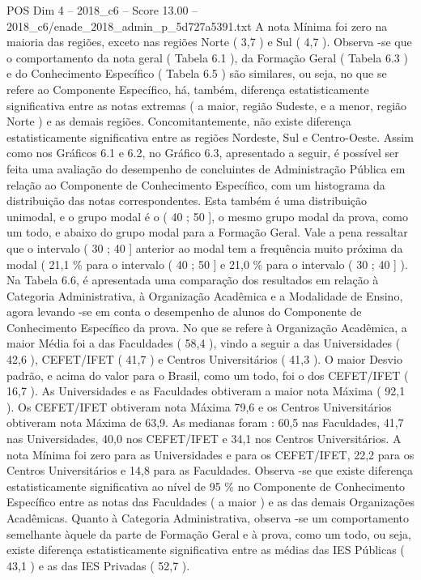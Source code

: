 \begin{textsample}{POS Dim 4 – 2018\_c6 – Score 13.00 – 2018\_c6/enade\_2018\_admin\_p\_5d727a5391.txt}
A nota Mínima foi zero na maioria das regiões, exceto nas regiões Norte ( 3,7 ) e Sul ( 4,7 ).
Observa -se que o comportamento da nota geral ( Tabela 6.1 ), da Formação Geral ( Tabela 6.3 ) e do Conhecimento Específico ( Tabela 6.5 ) são similares, ou seja, no que se refere ao Componente Específico, há, também, diferença estatisticamente significativa entre as notas extremas ( a maior, região Sudeste, e a menor, região Norte ) e as demais regiões.
Concomitantemente, não existe diferença estatisticamente significativa entre as regiões Nordeste, Sul e Centro-Oeste.
Assim como nos Gráficos 6.1 e 6.2, no Gráfico 6.3, apresentado a seguir, é possível ser feita uma avaliação do desempenho de concluintes de Administração Pública em relação ao Componente de Conhecimento Específico, com um histograma da distribuição das notas correspondentes.
Esta também é uma distribuição unimodal, e o grupo modal é o ( 40 ; 50 ], o mesmo grupo modal da prova, como um todo, e abaixo do grupo modal para a Formação Geral.
Vale a pena ressaltar que o intervalo ( 30 ; 40 ] anterior ao modal tem a frequência muito próxima da modal ( 21,1 \% para o intervalo ( 40 ; 50 ] e 21,0 \% para o intervalo ( 30 ; 40 ] ).
Na Tabela 6.6, é apresentada uma comparação dos resultados em relação à Categoria Administrativa, à Organização Acadêmica e a Modalidade de Ensino, agora levando -se em conta o desempenho de alunos do Componente de Conhecimento Específico da prova.
No que se refere à Organização Acadêmica, a maior Média foi a das Faculdades ( 58,4 ), vindo a seguir a das Universidades ( 42,6 ), CEFET/IFET ( 41,7 ) e Centros Universitários ( 41,3 ).
O maior Desvio padrão, e acima do valor para o Brasil, como um todo, foi o dos CEFET/IFET ( 16,7 ).
As Universidades e as Faculdades obtiveram a maior nota Máxima ( 92,1 ).
Os CEFET/IFET obtiveram nota Máxima 79,6 e os Centros Universitários obtiveram nota Máxima de 63,9.
As medianas foram : 60,5 nas Faculdades, 41,7 nas Universidades, 40,0 nos CEFET/IFET e 34,1 nos Centros Universitários.
A nota Mínima foi zero para as Universidades e para os CEFET/IFET, 22,2 para os Centros Universitários e 14,8 para as Faculdades.
Observa -se que existe diferença estatisticamente significativa ao nível de 95 \% no Componente de Conhecimento Específico entre as notas das Faculdades ( a maior ) e as das demais Organizações Acadêmicas.
Quanto à Categoria Administrativa, observa -se um comportamento semelhante àquele da parte de Formação Geral e à prova, como um todo, ou seja, existe diferença estatisticamente significativa entre as médias das IES Públicas ( 43,1 ) e as das IES Privadas ( 52,7 ).

\end{textsample}
